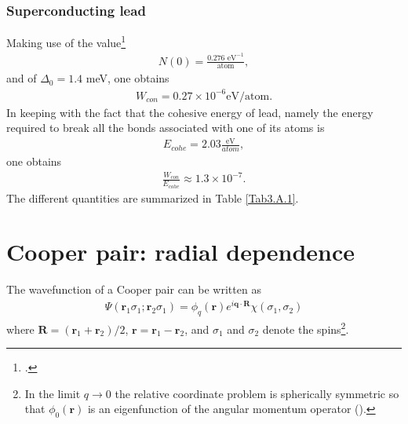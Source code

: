 \subsubsection{\textbf{Superconducting lead}}
Making use of the value\footnote{\cite{Beck:70}.}
\begin{align}\label{eqC3AppA5}
N(0)=\frac{0.276\text{ eV}^{-1}}{\text{atom}},
\end{align}
and of $\Delta_0=1.4$ meV, one obtains
\begin{align}\label{eqC3AppA6}
W_{con}=0.27\times10^{-6}\text{eV/atom}.
\end{align}
In keeping with the fact that the cohesive energy of lead, namely the energy required to break all the bonds associated with one of its atoms is
\begin{align}\label{eqC3AppA7}
E_{cohe}=2.03\frac{\text{eV}}{{atom}},
\end{align}
one obtains
\begin{align}\label{eqC3AppA8}
\frac{W_{con}}{E_{cohe}}\approx1.3\times10^{-7}.
\end{align}
The different quantities are summarized in Table \ref{Tab3.A.1}.
\section{Cooper pair: radial dependence}\label{App3B}

The wavefunction of a Cooper pair  can be written as
\begin{align}\label{eq3B1}
\Psi(\mathbf r_1\sigma_1;\mathbf r_2\sigma_1)=\phi_q(\mathbf r)e^{i\mathbf q\cdot\mathbf R}\chi(\sigma_1,\sigma_2)
\end{align}
where $\mathbf R=(\mathbf r_1+\mathbf r_2)/2$, $\mathbf r=\mathbf r_1-\mathbf r_2$, and $\sigma_1$ and $\sigma_2$ denote the spins\footnote{In the limit $q\rightarrow 0$ the relative coordinate problem is spherically symmetric so that $\phi_0(\mathbf r)$ is an eigenfunction of the angular momentum operator (\cite{Schrieffer:64}).}. 


